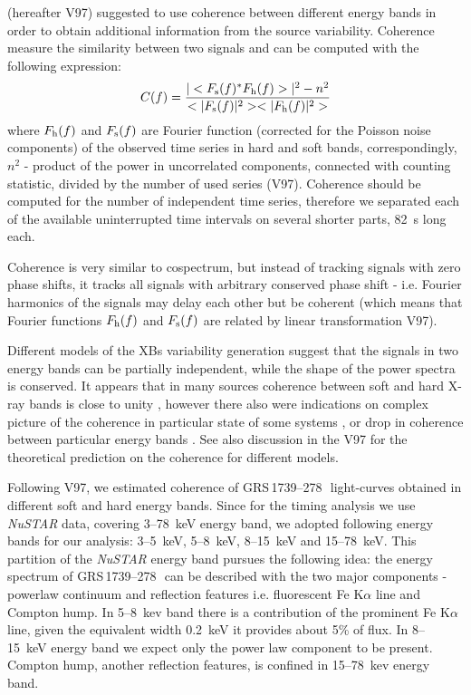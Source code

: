 \documentclass[a4paper,fleqn,usenatbib]{mnras}
\def\grs{{GRS\,1739--278\,}}
\begin{document}
\citet{1997ApJ...474L..43V}(hereafter V97) suggested to use coherence between different energy bands in order to obtain additional information from the source variability. 
Coherence measure the similarity between two signals and can be computed with the following expression:
\begin{equation}
        C(f) = \frac{|<F_{\rm s}(f)^*F_{\rm h}(f)>|^2 - n^2}{<|F_{\rm s}(f)|^2><|F_{\rm h}(f)|^2>}
    \label{eq:nowak_coh}
\end{equation}
where $F_{\rm h}(f)$ and $F_{\rm s}(f)$ are Fourier function (corrected for the Poisson noise components) of the observed time series in hard and soft bands, correspondingly, 
$n^2$ - product of the power in uncorrelated components, connected with counting statistic, divided by the number of used series (V97). 
Coherence should be computed for the number of independent time series, therefore we separated each of the available uninterrupted time intervals on several shorter parts, 82~s long each.  

Coherence is very similar to cospectrum, but instead of tracking signals with zero phase shifts, it tracks all signals with arbitrary conserved phase shift - i.e. Fourier harmonics of the signals may delay each other but be coherent (which means that Fourier functions $F_{\rm h}(f)$ and $F_{\rm s}(f)$ are related by linear transformation V97).

Different models of the XBs variability generation suggest that the signals in two energy bands can be partially independent, while the shape of the power spectra is conserved.
It appears that in many sources coherence between soft and hard X-ray bands is close to unity \citep{1999ApJ...517..355N, wijnands99}, however there also were indications on complex picture of the coherence in particular state of some systems \citep{2003ApJ...584L..23J}, or drop in coherence between particular energy bands \citep[e.g. in GX 339--4][]{1997ApJ...474L..43V}.
See also discussion in the V97 for the theoretical prediction on the coherence for different models.


Following V97, we estimated coherence of \grs\ light-curves obtained in different soft and hard energy bands. 
Since for the timing analysis we use {\it NuSTAR} data, covering 3--78~keV energy band, we adopted following energy bands for our analysis: 3--5~keV, 5--8~keV, 8--15~keV and 15--78~keV.
This partition of the {\it NuSTAR} energy band pursues the following idea: the energy spectrum of \grs\ can be described with the two major components - powerlaw continuum and reflection features i.e. fluorescent Fe K$\alpha$ line and Compton hump.
In 5--8~kev band there is a contribution of the prominent Fe K$\alpha$ line, given the equivalent width 0.2~keV it provides about 5\% of flux.
In 8--15~keV energy band we expect only the power law component to be present.
Compton hump, another reflection features, is confined in 15--78~kev energy band. 
\end{document}
